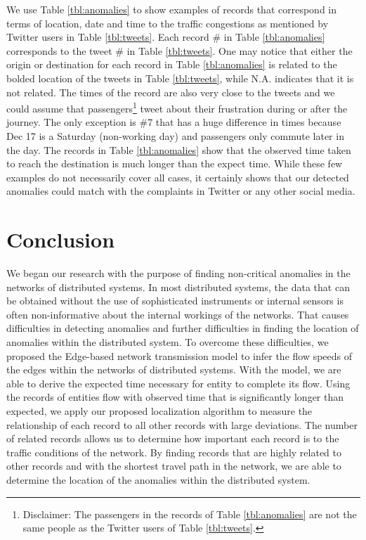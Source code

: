 \documentclass[conference]{IEEEtran.1.8}
\begin{document}
We use Table \ref{tbl:anomalies} to show examples of records that correspond in terms of location, date and time to the traffic congestions as mentioned by Twitter users in Table \ref{tbl:tweets}. Each record \# in Table \ref{tbl:anomalies} corresponds to the tweet \# in Table \ref{tbl:tweets}. One may notice that either the origin or destination for each record in Table \ref{tbl:anomalies} is related to the bolded location of the tweets in Table \ref{tbl:tweets}, while N.A. indicates that it is not related. The times of the record are also very close to the tweets and we could assume that passengers\footnote{Disclaimer: The passengers in the records of Table \ref{tbl:anomalies} are not the same people as the Twitter users of Table \ref{tbl:tweets}.} tweet about their frustration during or after the journey. The only exception is \#7 that has a huge difference in times because Dec 17 is a Saturday (non-working day) and passengers only commute later in the day. The records in Table \ref{tbl:anomalies} show that the observed time taken to reach the destination is much longer than the expect time. While these few examples do not necessarily cover all cases, it certainly shows that our detected anomalies could match with the complaints in Twitter or any other social media.

\section{Conclusion}
\label{sec:conclusion}

We began our research with the purpose of finding non-critical anomalies in the networks of distributed systems. In most distributed systems, the data that can be obtained without the use of sophisticated instruments or internal sensors is often non-informative about the internal workings of the networks. That causes difficulties in detecting anomalies and further difficulties in finding the location of anomalies within the distributed system. To overcome these difficulties, we proposed the Edge-based network transmission model to infer the flow speeds of the edges within the networks of distributed systems. With the model, we are able to derive the expected time necessary for entity to complete its flow. Using the records of entities flow with observed time that is significantly longer than expected, we apply our proposed localization algorithm to measure the relationship of each record to all other records with large deviations. The number of related records allows us to determine how important each record is to the traffic conditions of the network. By finding records that are highly related to other records and with the shortest travel path in the network, we are able to determine the location of the anomalies within the distributed system.
\end{document}
